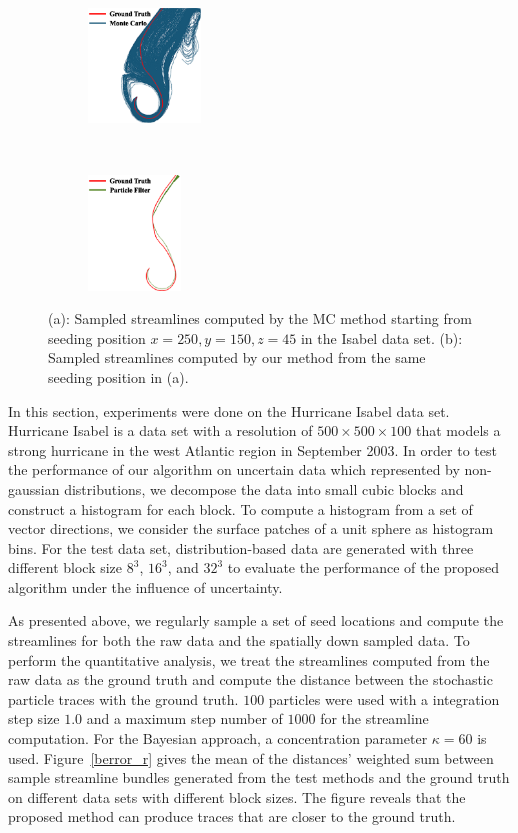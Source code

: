 \begin{figure}[!htbp]
  \centering
  \begin{subfigure}[!htbp]{0.25\textwidth}
    \centering
    \includegraphics[height=1.2in]{../figures/isabel_mc1.eps}
    \caption{}
    \label{case_4_a}
  \end{subfigure}~
  \begin{subfigure}[!htbp]{0.25\textwidth}
    \centering
    \includegraphics[height=1.2in]{../figures/isabel_smc1.eps}
    \caption{}
    \label{case_4_b}
  \end{subfigure}
  \caption{(a): Sampled streamlines computed by the MC method starting from seeding position $x=250, y=150, z=45$ in the Isabel data set. (b): Sampled streamlines computed by our method from the same seeding position in (a).}
  \label{case_4}
\end{figure}

In this section, experiments were done on the Hurricane Isabel data set. Hurricane Isabel is a data set with a resolution of $500 \times 500 \times 100$ that models a strong hurricane in the west Atlantic region in September 2003. In order to test the performance of our algorithm on uncertain data which represented by non-gaussian distributions, we decompose the data into small cubic blocks and construct a histogram for each block. To compute a histogram from a set of vector directions, we consider the surface patches of a unit sphere as histogram bins. For the test data set, distribution-based data are generated with three different block size $8^3$, $16^3$, and $32^3$ to evaluate the performance of the proposed algorithm under the influence of uncertainty.

As presented above, we regularly sample a set of seed locations and compute the streamlines for both the raw data and the spatially down sampled data. To perform the quantitative analysis, we treat the streamlines computed from the raw data as the ground truth and compute the distance between the stochastic particle traces with the ground truth. $100$ particles were used with a integration step size $1.0$ and a maximum step number of $1000$ for the streamline computation. For the Bayesian approach, a concentration parameter $\kappa = 60$ is used. Figure~\ref{berror_r} gives the mean of the distances' weighted sum between sample streamline bundles generated from the test methods and the ground truth on different data sets with different block sizes. The figure reveals that the proposed method can produce traces that are closer to the ground truth.

